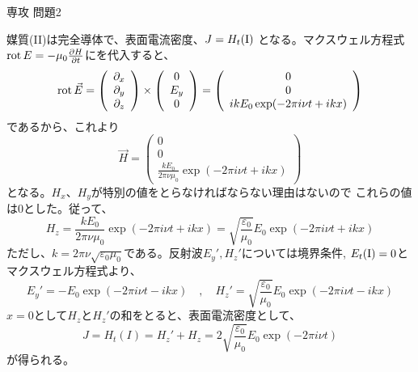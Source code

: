 \documentclass[fleqn]{jbook}
\begin{document}
\begin{answer}{専攻 問題2}{}
\begin{subanswers}
媒質(II)は完全導体で、表面電流密度、$ J = H_t({\rm{I}}) $
となる。マクスウェル方程式${\rm rot\,}E=-\mu_0\frac{\partial H}{\partial t}$にを代入すると、
\[ {\rm rot\,}\vec{E} = \left(\begin{array}{c}
                   \partial_x \\
                   \partial_y \\
                   \partial_z
              \end{array}\right)\times
              \left(\begin{array}{c}
                     0   \\
                     E_y \\
                     0   
               \end{array}\right)=
               \left(\begin{array}{c}
                     0     \\
                     0     \\
                    i k E_0\exp(-2\pi i\nu t +  i kx)
               \end{array}\right)                 \]
であるから、これより
\[   \vec{H} = \left(\begin{array}{c}
                   0    \\
                   0    \\
          \frac{kE_0}{2\pi\nu\mu_0}\exp(-2\pi i\nu t+ i kx)
            \end{array}\right)    \]
となる。$H_x$、$H_y$が特別の値をとらなければならない理由はないので
これらの値は$0$とした。従って、
\begin{equation}
     H_z=\frac{kE_0}{2\pi\nu\mu_0}\exp(-2\pi i\nu t+ i kx)
  =\sqrt{\frac{\varepsilon_0}{\mu_0}}E_0\exp(-2\pi i\nu t+ i kx) \nonumber
\end{equation}
ただし、$k=2\pi\nu\sqrt{\varepsilon_0 \mu_0}$である。反射波$E_y',H_z'$については境界条件,
$E_t({\rm{I}})=0$とマクスウェル方程式より、
\begin{equation}
  E_y'=-E_0\exp(-2\pi i\nu t- i kx) \quad , \quad H_z'=\sqrt{\frac{\varepsilon_0}{\mu_0}}E_0\exp(-2\pi i\nu t- i kx) \nonumber
\end{equation}
$x=0$として$H_z$と$H_z'$の和をとると、表面電流密度として、
\[  J=H_t(I)=H_z'+H_z=2\sqrt{\frac{\varepsilon_0}{\mu_0}}E_0\exp(-2\pi i\nu t)\]
が得られる。


\end{subanswers}
\end{answer}
\end{document}
